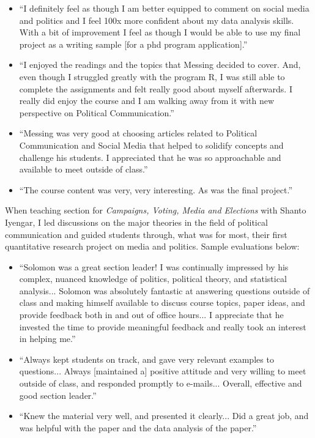 \documentclass[12pt]{article}
\begin{document}
\begin{itemize}
\item ``I definitely feel as though I am better equipped to comment on social media and politics and I feel 100x more confident about my data analysis skills. With a bit of improvement I feel as though I would be able to use my final project as a writing sample [for a phd program application].''
\item ``I enjoyed the readings and the topics that Messing decided to cover. And, even though I struggled greatly with the program R, I was still able to complete the assignments and felt really good about myself afterwards. I really did enjoy the course and I am walking away from it with new perspective on Political Communication.''
\item ``Messing was very good at choosing articles related to Political Communication and Social Media that helped to solidify concepts and challenge his students. I appreciated that he was so approachable and available to meet outside of class.''
\item ``The course content was very, very interesting. As was the final project.''
\end{itemize}

When teaching section for \emph{Campaigns, Voting, Media and Elections} with Shanto Iyengar, I led discussions on the major theories in the field of political communication and guided students through, what was for most, their first quantitative research project on media and politics.  Sample evaluations below:

\begin{itemize}
\item ``Solomon was a great section leader! I was continually impressed by his complex, nuanced knowledge of politics, political theory, and statistical analysis... Solomon was absolutely fantastic at answering questions outside of class and making himself available to discuss course topics, paper ideas, and provide feedback both in and out of office hours...  I appreciate that he invested the time to provide meaningful feedback and really took an interest in helping me.''
\item ``Always kept students on track, and gave very relevant examples to questions... Always [maintained a] positive attitude and very willing to meet outside of class, and responded promptly to e-mails... Overall, effective and good section leader.''
\item ``Knew the material very well, and presented it clearly... Did a great job, and was helpful with the paper and the data analysis of the paper.''
\end{itemize}
\end{document}
